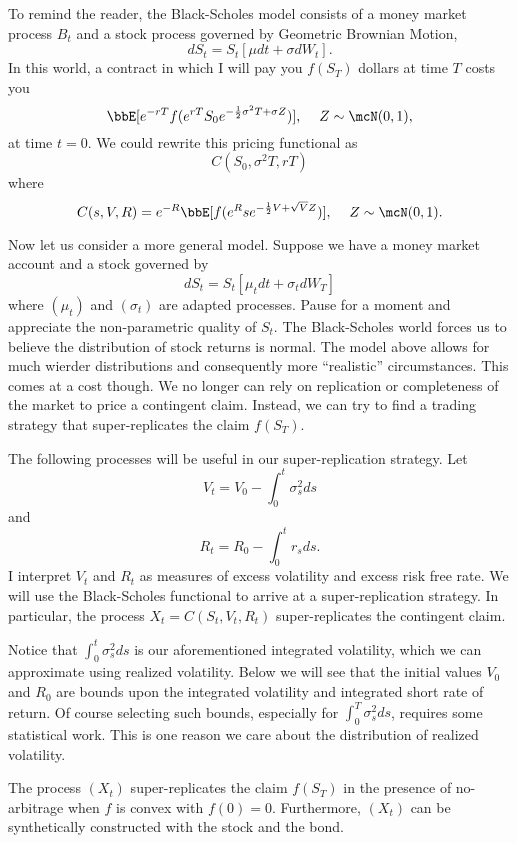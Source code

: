 \documentclass{report}
\begin{document}
To remind the reader, the Black-Scholes model consists of a money market
process $B_t$ and a stock process governed by Geometric Brownian
Motion,
\[
dS_t = S_t [ \mu dt + \sigma dW_t ].
\]
In this world, a contract in which I will pay you $f(S_T)$ dollars at
time $T$ costs you
\[
\bbE[ e^{-rT} f(e^{r T} S_0 e^{-\frac{1}{2} \sigma^2 T + \sigma Z}) ],
\hspace{12pt} Z \sim \mcN(0,1),
\]
at time $t = 0$.  We could rewrite this pricing functional as
\[
C(S_0, \sigma^2 T, r T)
\]
where
\[
C(s,V,R) = e^{-R} \bbE[ f(e^R s e^{-\frac{1}{2} V + \sqrt{V} Z}) ],
\hspace{12pt} Z \sim \mcN(0,1).
\]

Now let us consider a more general model.  Suppose we have a money
market account and a stock governed by
\[
dS_t = S_t [ \mu_t dt + \sigma_t dW_T ]
\]
where $(\mu_t)$ and $(\sigma_t)$ are adapted processes.  Pause for a
moment and appreciate the non-parametric quality of $S_t$.  The
Black-Scholes world forces us to believe the distribution of stock
returns is normal.  The model above allows for much wierder
distributions and consequently more ``realistic'' circumstances.  This
comes at a cost though.  We no longer can rely on replication or
completeness of the market to price a contingent claim.  Instead, we
can try to find a trading strategy that super-replicates the claim
$f(S_T)$.  

The following processes will be useful in our super-replication
strategy.  Let
\[
V_t = V_0 - \int_0^t \sigma_s^2 ds
\]
and
\[
R_t = R_0 - \int_0^t r_s ds.
\]  
I interpret $V_t$ and $R_t$ as measures of excess volatility and
excess risk free rate.  We will use the Black-Scholes functional to
arrive at a super-replication strategy.  In particular, the process
$X_t = C(S_t, V_t, R_t)$ super-replicates the contingent claim.

Notice that $\int_0^t \sigma_s^2 ds$ is our aforementioned integrated
volatility, which we can approximate using realized volatility.  Below
we will see that the initial values $V_0$ and $R_0$ are bounds upon
the integrated volatility and integrated short rate of return.  Of
course selecting such bounds, especially for $\int_0^T \sigma_s^2 ds$,
requires some statistical work.  This is one reason we care about the
distribution of realized volatility.

\begin{claim}
The process $(X_t)$ super-replicates the claim $f(S_T)$ in the
presence of no-arbitrage when $f$ is convex with $f(0) = 0$. 
Furthermore, $(X_t)$ can be synthetically constructed with the stock
and the bond.
\end{claim}
\end{document}
